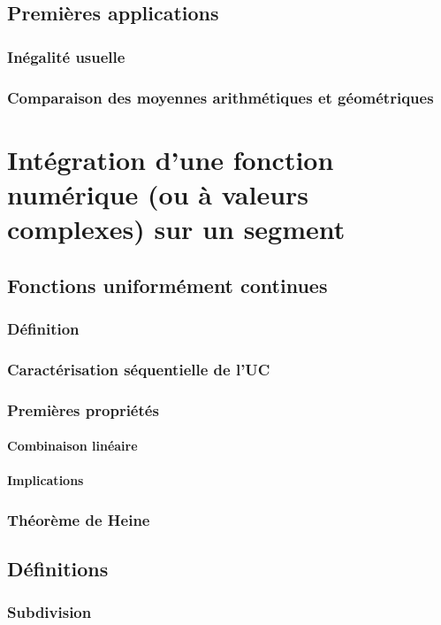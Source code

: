 \documentclass[12pt,a4paper,french]{book}
\begin{document}
	\section{Premières applications}
		\subsection{Inégalité usuelle}
		\subsection{Comparaison des moyennes arithmétiques et géométriques}
		
\chapter{Intégration d'une fonction numérique (ou à valeurs complexes) sur un segment}
	\section{Fonctions uniformément continues}
		\subsection{Définition}
		\subsection{Caractérisation séquentielle de l'UC}
		\subsection{Premières propriétés}
			\subsubsection{Combinaison linéaire}
			\subsubsection{Implications}
		\subsection{Théorème de Heine}
	\section{Définitions}
		\subsection{Subdivision}
\end{document}
